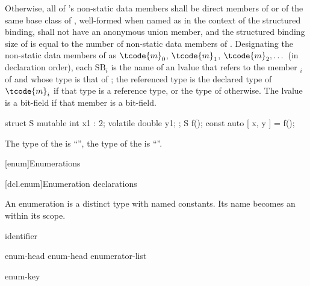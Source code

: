 \pnum
Otherwise,
all of 's non-static data members
shall be direct members of  or
of the same base class of ,
well-formed when named as 
in the context of the structured binding,
 shall not have an anonymous union member, and
the structured binding size of  is
equal to the number of non-static data members of .
Designating the non-static data members of  as
$\tcode{m}_0$, $\tcode{m}_1$, $\tcode{m}_2, \dotsc$
(in declaration order),
each $\textrm{SB}_i$ is the
name of an lvalue that refers to the member $_i$ of  and
whose type is
that of ;
the referenced type is
the declared type of $\tcode{m}_i$ if that type is a reference type, or
the type of  otherwise.
The lvalue is a
bit-field if that member is a bit-field.
\begin{example}
\begin{codeblock}
struct S { mutable int x1 : 2; volatile double y1; };
S f();
const auto [ x, y ] = f();
\end{codeblock}
The type of the   is ``'',
the type of the   is ``''.
\end{example}

[enum]{Enumerations}%

[dcl.enum]{Enumeration declarations}%
%
%

\pnum
An enumeration is a distinct type with named
constants. Its name becomes an  within its scope.

\begin{bnf}
\br
    identifier
\end{bnf}

\begin{bnf}
\br
    enum-head \terminal{\{}  \terminal{\}}\br
    enum-head \terminal{\{} enumerator-list \terminal{,} \terminal{\}}
\end{bnf}

\begin{bnf}
\br
    enum-key   
\end{bnf}

